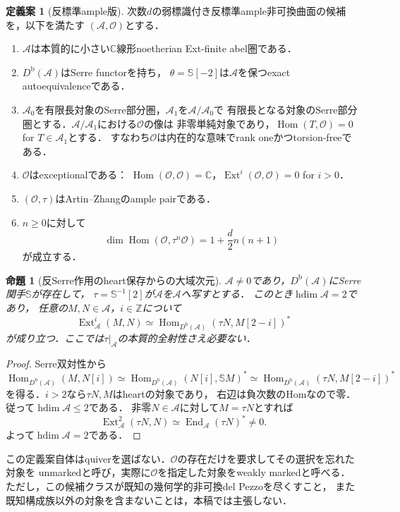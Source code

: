 \documentclass[11pt,a4paper]{ltjsarticle}
\newtheorem{proposition}[theorem]{命題}
\theoremstyle{definition}
\newtheorem{definition}[theorem]{定義案}
\newcommand{\OO}{\mathcal O}
\renewcommand{\AA}{\mathcal A}
\newcommand{\SSer}{\mathbb S}
\newcommand{\Db}{D^{\mathrm b}}
\newcommand{\Hom}{\operatorname{Hom}}
\newcommand{\End}{\operatorname{End}}
\newcommand{\Ext}{\operatorname{Ext}}
\begin{document}
\begin{definition}[反標準ample版]\label{def:fano}
次数$d$の弱標識付き反標準ample非可換曲面の候補を，以下を満たす
$(\AA,\OO)$とする．
\begin{enumerate}
\item $\AA$は本質的に小さい$\mathbb C$線形noetherian Ext-finite abel圏である．
\item $\Db(\AA)$はSerre functorを持ち，
$\theta=\SSer[-2]$は$\AA$を保つexact autoequivalenceである．
\item $\AA_0$を有限長対象のSerre部分圏，$\AA_1$を$\AA/\AA_0$で
有限長となる対象のSerre部分圏とする．$\AA/\AA_1$における$\OO$の像は
非零単純対象であり，$\Hom(T,\OO)=0$ for $T\in\AA_1$とする．
すなわち$\OO$は内在的な意味でrank oneかつtorsion-freeである．
\item $\OO$はexceptionalである：
$\Hom(\OO,\OO)=\mathbb C$，$\Ext^i(\OO,\OO)=0$ for $i>0$．
\item $(\OO,\tau)$はArtin--Zhangのample pairである．
\item $n\geq0$に対して
\begin{equation}\label{eq:hilbert-dim}
 \dim\Hom(\OO,\tau^n\OO)=1+\frac d2n(n+1)
\end{equation}
が成立する．
\end{enumerate}
\end{definition}

\begin{proposition}[反Serre作用のheart保存からの大域次元]
\label{prop:serre-heart-hdim}
$\AA\ne0$であり，$\Db(\AA)$にSerre関手$\SSer$が存在して，
$\tau=\SSer^{-1}[2]$が$\AA$を$\AA$へ写すとする．
このとき$\operatorname{hdim}\AA=2$であり，
任意の$M,N\in\AA$，$i\in\mathbb Z$について
\begin{equation}\label{eq:serre-automatic-ext}
\Ext^i_{\AA}(M,N)\simeq
\Hom_{\Db(\AA)}(\tau N,M[2-i])^*
\end{equation}
が成り立つ．ここでは$\tau|_{\AA}$の本質的全射性さえ必要ない．
\end{proposition}
\begin{proof}
Serre双対性から
\[
\Hom_{\Db(\AA)}(M,N[i])
\simeq\Hom_{\Db(\AA)}(N[i],\SSer M)^*
\simeq\Hom_{\Db(\AA)}(\tau N,M[2-i])^*
\]
を得る．$i>2$なら$\tau N,M$はheartの対象であり，
右辺は負次数のHomなので零．従って$\operatorname{hdim}\AA\le2$である．
非零$N\in\AA$に対して$M=\tau N$とすれば
\[
\Ext^2_{\AA}(\tau N,N)\simeq\End_{\AA}(\tau N)^*\ne0.
\]
よって$\operatorname{hdim}\AA=2$である．
\end{proof}

この定義案自体はquiverを選ばない．$\OO$の存在だけを要求してその選択を忘れた対象を
unmarkedと呼び，実際に$\OO$を指定した対象をweakly markedと呼べる．
ただし，この候補クラスが既知の幾何学的非可換del Pezzoを尽くすこと，
また既知構成族以外の対象を含まないことは，本稿では主張しない．
\end{document}
